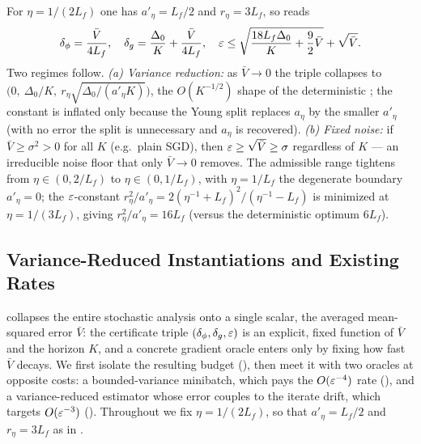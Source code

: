 \begin{remark}
\label{rem:stoch-ps-dca-instance}
For $\eta=1/(2L_f)$ one has $a'_\eta=L_f/2$ and $r_\eta=3L_f$, so
 reads
\[
    \delta_\phi=\frac{\bar V}{4L_f},
    \quad
    \delta_g=\frac{\Delta_0}K+\frac{\bar V}{4L_f},
    \quad
    \varepsilon\le
    \sqrt{\frac{18L_f\Delta_0}{K}+\frac92\bar V}+\sqrt{\bar V}.
\]
Two regimes follow. \emph{(a) Variance reduction:} as $\bar V\to0$ the
triple collapses to
$\bigl(0,\ \Delta_0/K,\ r_\eta\sqrt{\Delta_0/(a'_\eta K)}\bigr)$, the
$O(K^{-1/2})$ shape of the deterministic
; the constant is inflated only because the
Young split replaces $a_\eta$ by the smaller $a'_\eta$ (with no error the
split is unnecessary and $a_\eta$ is recovered). \emph{(b) Fixed noise:}
if $\bar V\ge\sigma^2>0$ for all $K$ (e.g.\ plain SGD), then
$\varepsilon\ge\sqrt{\bar V}\ge\sigma$ regardless of $K$ --- an irreducible
noise floor that only $\bar V\to0$ removes. The admissible range
tightens from $\eta\in(0,2/L_f)$ to $\eta\in(0,1/L_f)$, with
$\eta=1/L_f$ the degenerate boundary $a'_\eta=0$; the $\varepsilon$-constant
$r_\eta^2/a'_\eta=2(\eta^{-1}+L_f)^2/(\eta^{-1}-L_f)$ is minimized at
$\eta=1/(3L_f)$, giving $r_\eta^2/a'_\eta=16L_f$ (versus the
deterministic optimum $6L_f$).
\end{remark}

\subsection{Variance-Reduced Instantiations and Existing Rates}
\label{subsec:stoch-instances}

 collapses the entire stochastic analysis onto a
single scalar, the averaged mean-squared error $\bar V$: the certificate triple
$(\delta_\phi,\delta_g,\varepsilon)$ is an explicit, fixed function of $\bar V$ and the
horizon $K$, and a concrete gradient oracle enters only by fixing how fast
$\bar V$ decays. We first isolate the resulting budget
(), then meet it with two oracles at opposite costs:
a bounded-variance minibatch, which pays the $O(\varepsilon^{-4})$ rate
(), and a variance-reduced estimator whose error couples to
the iterate drift, which targets $O(\varepsilon^{-3})$ ().
Throughout we fix $\eta=1/(2L_f)$, so that $a'_\eta=L_f/2$ and $r_\eta=3L_f$ as in
.

